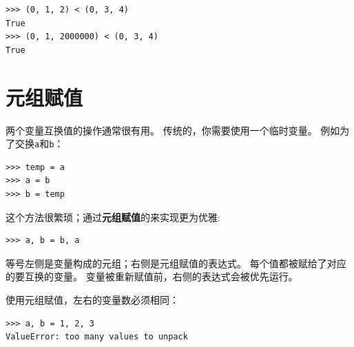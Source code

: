 \begin{lstlisting}
>>> (0, 1, 2) < (0, 3, 4)
True
>>> (0, 1, 2000000) < (0, 3, 4)
True
\end{lstlisting}


\section{元组赋值}
\label{tuple.assignment}  
 


两个变量互换值的操作通常很有用。 传统的，你需要使用一个临时变量。 例如为了交换\lstinline{a}和\lstinline{b}：

\begin{lstlisting}
>>> temp = a
>>> a = b
>>> b = temp
\end{lstlisting}
%

这个方法很繁琐；通过{\bf 元组赋值}的来实现更为优雅:

\begin{lstlisting}
>>> a, b = b, a
\end{lstlisting}
%

等号左侧是变量构成的元组；右侧是元组赋值的表达式。  每个值都被赋给了对应的要互换的变量。  变量被重新赋值前，右侧的表达式会被优先运行。


使用元组赋值，左右的变量数必须相同：

  

\begin{lstlisting}
>>> a, b = 1, 2, 3
ValueError: too many values to unpack
\end{lstlisting}
%

